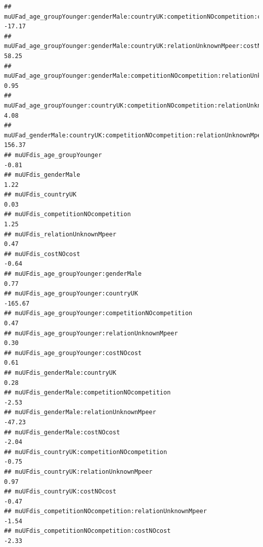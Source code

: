 \documentclass[
]{article}
\begin{document}
\begin{verbatim}
## muUFad_age_groupYounger:genderMale:countryUK:competitionNOcompetition:costNOcost               -17.17
## muUFad_age_groupYounger:genderMale:countryUK:relationUnknownMpeer:costNOcost                    58.25
## muUFad_age_groupYounger:genderMale:competitionNOcompetition:relationUnknownMpeer:costNOcost      0.95
## muUFad_age_groupYounger:countryUK:competitionNOcompetition:relationUnknownMpeer:costNOcost       4.08
## muUFad_genderMale:countryUK:competitionNOcompetition:relationUnknownMpeer:costNOcost           156.37
## muUFdis_age_groupYounger                                                                        -0.81
## muUFdis_genderMale                                                                               1.22
## muUFdis_countryUK                                                                                0.03
## muUFdis_competitionNOcompetition                                                                 1.25
## muUFdis_relationUnknownMpeer                                                                     0.47
## muUFdis_costNOcost                                                                              -0.64
## muUFdis_age_groupYounger:genderMale                                                              0.77
## muUFdis_age_groupYounger:countryUK                                                            -165.67
## muUFdis_age_groupYounger:competitionNOcompetition                                                0.47
## muUFdis_age_groupYounger:relationUnknownMpeer                                                    0.30
## muUFdis_age_groupYounger:costNOcost                                                              0.61
## muUFdis_genderMale:countryUK                                                                     0.28
## muUFdis_genderMale:competitionNOcompetition                                                     -2.53
## muUFdis_genderMale:relationUnknownMpeer                                                        -47.23
## muUFdis_genderMale:costNOcost                                                                   -2.04
## muUFdis_countryUK:competitionNOcompetition                                                      -0.75
## muUFdis_countryUK:relationUnknownMpeer                                                           0.97
## muUFdis_countryUK:costNOcost                                                                    -0.47
## muUFdis_competitionNOcompetition:relationUnknownMpeer                                           -1.54
## muUFdis_competitionNOcompetition:costNOcost                                                     -2.33

\end{verbatim}
\end{document}
